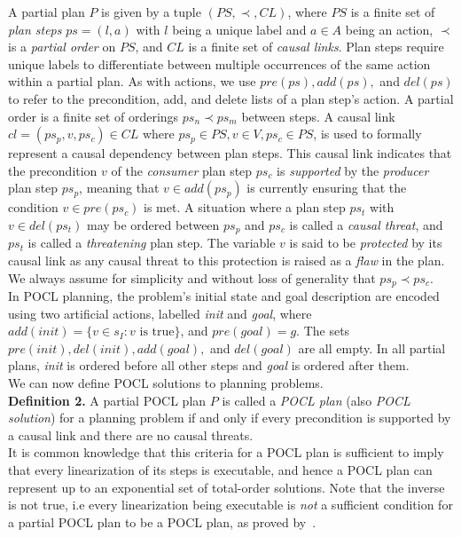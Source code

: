 A partial plan $P$ is given by a tuple $(PS,\prec , CL)$, where $PS$ is a finite set of \textit{plan steps} $ps=(l,a)$ with $l$ being a unique label and $a\in A$ being an action, $\prec$ is a \textit{partial order} on $PS$, and $CL$ is a finite set of \textit{causal links}. Plan steps require unique labels to differentiate between multiple occurrences of the same action within a partial plan. As with actions, we use $pre(ps),add(ps),$ and $del(ps)$ to refer to the precondition, add, and delete lists of a plan step's action. A partial order is a finite set of orderings $ps_n \prec ps_m$ between steps. A causal link $cl=(ps_p, v, ps_c)\in CL$ where $ps_p \in PS, v\in V, ps_c \in PS$, is used to formally represent a causal dependency between plan steps. This causal link indicates that the precondition $v$ of the \textit{consumer} plan step $ps_c$ is \textit{supported} by the \textit{producer} plan step $ps_p$, meaning that $v\in add(ps_p)$ is currently ensuring that the condition $v\in pre(ps_c)$ is met. A situation where a plan step $ps_t$ with $v\in del(ps_t)$ may be ordered between $ps_p$ and $ps_c$ is called a \textit{causal threat}, and $ps_t$ is called a \textit{threatening} plan step. The variable $v$ is said to be \textit{protected} by its causal link as any causal threat to this protection is raised as a \textit{flaw} in the plan. We always assume for simplicity and without loss of generality that $ps_p\prec ps_c$.\\


In POCL planning, the problem's initial state and goal description are encoded using two artificial actions, labelled \textit{init} and \textit{goal}, where $add(init)=\{v\in s_I: v \text{ is true}\}$, and $pre(goal)=g$. The sets $pre(init),del(init),add(goal),$ and $del(goal)$ are all empty. In all partial plans, \textit{init} is ordered before all other steps and \textit{goal} is ordered after them. \\


We can now define POCL solutions to planning problems.\\

\textbf{Definition 2.} A partial POCL plan $P$ is called a \textit{POCL plan} (also \textit{POCL solution}) for a planning problem if and only if every precondition is supported by a causal link and there are no causal threats.\\


It is common knowledge that this criteria for a POCL plan is sufficient to imply that every linearization of its steps is executable, and hence a POCL plan can represent up to an exponential set of total-order solutions. Note that the inverse is not true, i.e every linearization being executable is \textit{not} a sufficient condition for a partial POCL plan to be a POCL plan, as proved by~\cite{Bercher2020POPvsPOCL}.


